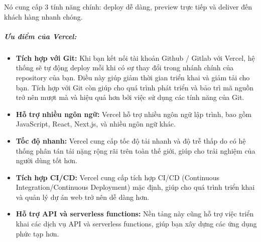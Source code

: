 Nó cung cấp 3 tính năng chính: deploy dễ dàng, preview trực tiếp và deliver đến khách hàng nhanh chóng.

\subparagraph{Ưu điểm của Vercel:}
\begin{itemize}
    \item \textbf{Tích hợp với Git:} Khi bạn kết nối tài khoản Github / Gitlab với Vercel, hệ thống sẽ tự động deploy mỗi khi có sự thay đổi trong nhánh chính của repository của bạn. Điều này giúp giảm thời gian triển khai và giảm tải cho bạn. Tích hợp với Git còn giúp cho quá trình phát triển và bảo trì mã nguồn trở nên mượt mà và hiệu quả hơn bởi việc sử dụng các tính năng của Git.
    \item \textbf{Hỗ trợ nhiều ngôn ngữ:} Vercel hỗ trợ nhiều ngôn ngữ lập trình, bao gồm JavaScript, React, Next.js, và nhiều ngôn ngữ khác.
    \item \textbf{Tốc độ nhanh:} Vercel cung cấp tốc độ tải nhanh và độ trễ thấp do có hệ thống phân tán tải nặng rộng rãi trên toàn thế giới, giúp cho trải nghiệm của người dùng tốt hơn.
    \item \textbf{Tích hợp CI/CD:} Vercel cung cấp tích hợp CI/CD (Continuous Integration/Continuous Deployment) mặc định, giúp cho quá trình triển khai và quản lý dự án web trở nên dễ dàng hơn.
    \item \textbf{Hỗ trợ API và serverless functions:} Nền tảng này cũng hỗ trợ việc triển khai các dịch vụ API và serverless functions, giúp bạn xây dựng các ứng dụng phức tạp hơn.
\end{itemize}
